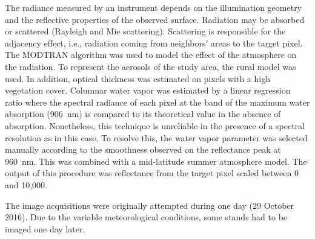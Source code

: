 \documentclass[remotesensing,article,accept,moreauthors,pdftex]{Definitions/mdpi}
\begin{document}
\begin{paracol}{2}
The radiance measured by an instrument depends on the illumination geometry and the reflective properties of the observed surface.
Radiation may be absorbed or scattered (Rayleigh and Mie scattering).
Scattering is responsible for the adjacency effect, i.e., radiation coming from neighbors' areas to the target pixel.
The MODTRAN algorithm was used to model the effect of the atmosphere on the radiation.
To represent the aerosols of the study area, the rural model was used.
In addition, optical thickness was estimated on pixels with a high vegetation cover.
Columnar water vapor was estimated by a linear regression ratio where the spectral radiance of each pixel at the band of the maximum water absorption (906~nm) is compared to its theoretical value in the absence of absorption.
Nonetheless, this technique is unreliable in the presence of a spectral resolution as in this case.
To resolve this, the water vapor parameter was selected manually according to the smoothness observed on the reflectance peak at 960~nm.
This was combined with a mid-latitude summer atmosphere model.
The output of this procedure was reflectance from the target pixel scaled between 0 and 10,000.

The image acquisitions were originally attempted during one day (29 October 2016).
Due to the variable meteorological conditions, some stands had to be imaged one day later.

\end{paracol}

\end{document}
